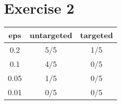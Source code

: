 
\section*{Exercise 2}

\begin{center}
\begin{tabular}{ |c|c|c| } 
 \hline
eps & untargeted & targeted  \\ 
\hline
 0.2 & 5/5 & 1/5 \\ 
 0.1 & 4/5 & 0/5 \\ 
 0.05 & 1/5 & 0/5 \\ 
 0.01 & 0/5 & 0/5 \\ 
 \hline
\end{tabular}
\end{center}